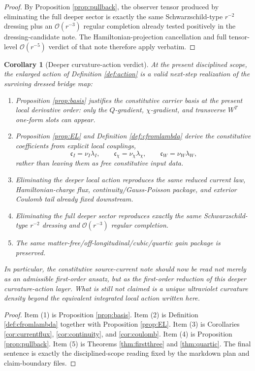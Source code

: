 \documentclass[11pt]{article}
\newtheorem{corollary}{Corollary}
\begin{document}
\begin{proof}
By Proposition \ref{prop:pullback}, the observer tensor produced by eliminating the full deeper sector is exactly the same Schwarzschild-type \(r^{-2}\) dressing plus an \(\mathcal O(r^{-3})\) regular completion already tested positively in the dressing-candidate note. The Hamiltonian-projection cancellation and full tensor-level \(\mathcal O(r^{-5})\) verdict of that note therefore apply verbatim.
\end{proof}

\begin{corollary}[Deeper curvature-action verdict]
\label{cor:verdict}
At the present disciplined scope, the enlarged action of Definition \ref{def:action} is a valid next-step realization of the surviving dressed bridge map:
\begin{enumerate}
    \item Proposition \ref{prop:basis} justifies the constitutive carrier basis at the present local derivative order: only the \(Q\)-gradient, \(\chi\)-gradient, and transverse \(W^T\) one-form slots can appear.
    \item Proposition \ref{prop:EL} and Definition \ref{def:cfromlambda} derive the constitutive coefficients from explicit local couplings,
    \[
    \mathfrak c_I=\nu_I\lambda_I,
    \qquad
    \mathfrak c_\chi=\nu_\chi\lambda_\chi,
    \qquad
    \mathfrak c_W=\nu_W\lambda_W,
    \]
    rather than leaving them as free constitutive input data.
    \item Eliminating the deeper local action reproduces the same reduced current law, Hamiltonian-charge flux, continuity/Gauss-Poisson package, and exterior Coulomb tail already fixed downstream.
    \item Eliminating the full deeper sector reproduces exactly the same Schwarzschild-type \(r^{-2}\) dressing and \(\mathcal O(r^{-3})\) regular completion.
    \item The same matter-free/off-longitudinal/cubic/quartic gain package is preserved.
\end{enumerate}
In particular, the constitutive source-current note should now be read not merely as an admissible first-order ansatz, but as the first-order reduction of this deeper curvature-action layer. What is \emph{still} not claimed is a unique ultraviolet curvature density beyond the equivalent integrated local action written here.
\end{corollary}

\begin{proof}
Item (1) is Proposition \ref{prop:basis}. Item (2) is Definition \ref{def:cfromlambda} together with Proposition \ref{prop:EL}. Item (3) is Corollaries \ref{cor:currentflux}, \ref{cor:continuity}, and \ref{cor:coulomb}. Item (4) is Proposition \ref{prop:pullback}. Item (5) is Theorems \ref{thm:firstthree} and \ref{thm:quartic}. The final sentence is exactly the disciplined-scope reading fixed by the markdown plan and claim-boundary files.
\end{proof}
\end{document}
